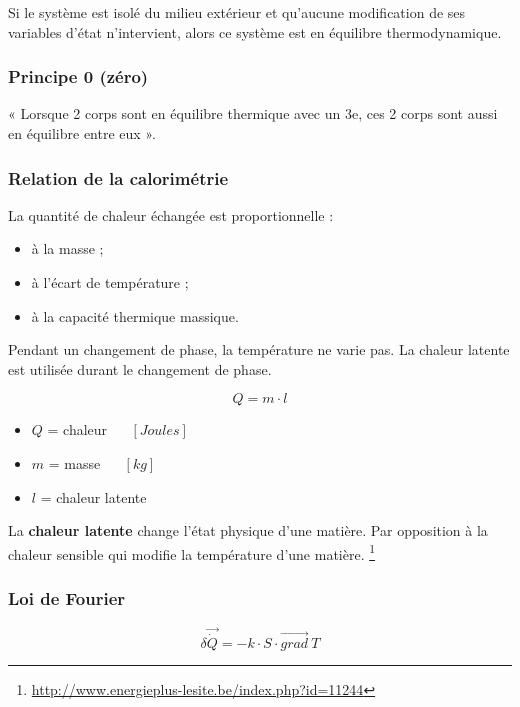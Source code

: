 \documentclass[]{article}
\providecommand{\tightlist}{%
  \setlength{\itemsep}{0pt}\setlength{\parskip}{0pt}}
\begin{document}
Si le système est isolé du milieu extérieur et qu’aucune modification de ses variables d’état n’intervient, alors ce système est en équilibre thermodynamique.

\subsubsection{Principe 0 (zéro)}\label{principe-0-zuxe9ro}

« Lorsque 2 corps sont en équilibre thermique avec un 3e, ces 2 corps
sont aussi en équilibre entre eux ».

\subsubsection{Relation de la calorimétrie}\label{relation-de-la-calorimetrie}

La quantité de chaleur échangée est proportionnelle :

\begin{itemize}
\tightlist
\item
  à la masse ;
\item
  à l’écart de température ;
\item
  à la capacité thermique massique.
\end{itemize}

Pendant un changement de phase, la température ne varie pas. La chaleur
latente est utilisée durant le changement de phase.

$$ Q = m \cdot l $$

\begin{itemize}
\tightlist
\item
  $ Q $ = chaleur  ~~ $ [ Joules ] $
\item
  $ m $ = masse ~~ $ [kg] $
\item
  $ l $ = chaleur latente \\
\end{itemize}

La \textbf{chaleur latente} change l’état physique d’une matière. Par opposition à la chaleur sensible qui modifie la température d’une matière. \footnote{\url{http://www.energieplus-lesite.be/index.php?id=11244}}



\subsubsection{Loi de Fourier}\label{loi-fourier}

$$ \delta \vec{\dot{Q}} = -k \cdot S \cdot \vec{grad}~ T $$
\end{document}
